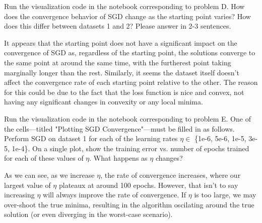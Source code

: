 \begin{problem}[2]
  Run the visualization code in the notebook corresponding to problem D. How does the convergence behavior of SGD change as the starting point varies? How does this differ between datasets 1 and 2? Please answer in 2-3 sentences.
\end{problem}
\begin{solution}
 It appears that the starting point does not have a significant impact on the convergence of SGD as, regardless of the starting point, the solutions converge to the same point at around the same time, with the furtherest point taking marginally longer than the rest. Similarly, it seems the dataset itself doesn't affect the convergence rate of each starting point relative to the other. The reason for this could be due to the fact that the loss function is nice and convex, not having any significant changes in convexity or any local minima.
\end{solution}

\begin{problem}[6]
  Run the visualization code in the notebook corresponding to problem E. One of the cells---titled "Plotting SGD Convergence"---must be filled in as follows. Perform SGD on dataset 1 for each of the learning rates $\eta \in$ \{1e-6, 5e-6, 1e-5, 3e-5, 1e-4\}. On a single plot, show the training error vs. number of epochs trained for each of these values of $\eta$. What happens as $\eta$ changes?
\end{problem}

\begin{solution}
 \begin{figure}[H]
 \end{figure}
 As we can see, as we increase $\eta$, the rate of convergence increases, where our largest value of $\eta$ plateaux at around 100 epochs. However, that isn't to say increasing $\eta$ will always improve the rate of convergence. If $\eta$ is too large, we may over-shoot the true minima, resulting in the algorithm oscilating around the true solution (or even diverging in the worst-case scenario).
\end{solution}


